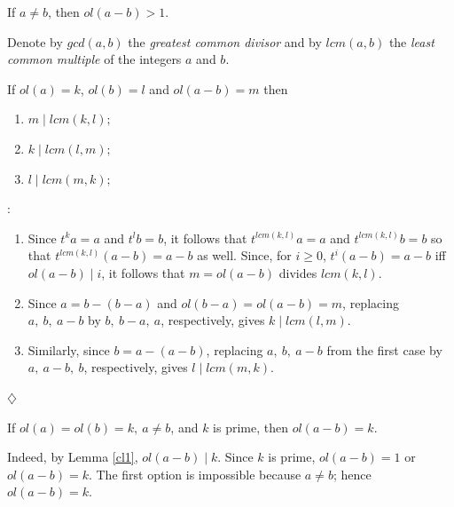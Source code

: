 {\begin{obs}\label{cl01} %
	If $a \neq b$, then $ol(a-b) > 1$.
\end{obs}


Denote by $ gcd(a,b)$ the {\it greatest common divisor} and by 
$lcm(a,b)$ the {\it least common multiple} of the integers $a$ and $b$. 

\begin{lem}\label{cl1} %
	If $ ol(a)=k $, $ ol(b)=l $ and $ ol(a-b)=m $ then
	\begin{enumerate}
	      \item $ m \mid lcm(k,l); $  
	      \item $ k \mid lcm(l,m); $   
	      \item $ l \mid lcm(m,k); $   
	\end{enumerate}     %
\end{lem}                                                   
\begin{pr}: 
{\rm
	  \begin{enumerate}
	      \item Since $t^{k}a=a$ and $t^{l}b=b$, it follows that
		    $t^{lcm(k,l)}a=a$ and $t^{lcm(k,l)}b=b$ so that 
		    $t^{lcm(k,l)}(a-b)=a-b$ as well.
		    Since, for $i \geq 0$,
		    $t^{i}(a-b)=a-b$ iff $ol(a-b) \mid i$, it follows
		    that $m=ol(a-b)$ divides $lcm(k,l)$.
	      
	      \item Since $a=b-(b-a)$ and $ol(b-a)=ol(a-b)=m$, replacing 
		    $a, \ b, \ a-b $ by $b, \ b-a, \ a$, respectively, gives 
		    $ k \mid lcm(l,m) $.
	      \item Similarly, since $b=a-(a-b)$, replacing  
		    $a, \ b, \ a-b $ from the first case by $a, \ a-b, \ b$, 
		    respectively, gives $ l \mid lcm(m,k) $.
	\end{enumerate}
		       }
	\begin{flushright}
		$\diamondsuit$
	\end{flushright}
\end{pr}

\begin{cor}\label{cl11} %
	If $ ol(a)=ol(b)=k, \ a \neq b $, and $k$ is prime, then $ol(a-b)=k$.
\end{cor}

{\rm
Indeed, by Lemma \ref{cl1}, $ol(a-b) \mid k$. Since $k$ is prime, 
$ol(a-b)=1$ or $ol(a-b)=k$. The first option is impossible because $ a \neq b$;
hence $ol(a-b)=k$.
	  }

}
